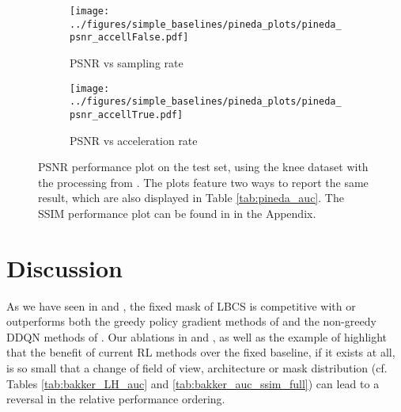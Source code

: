 \begin{figure}[!ht]
    \centering
    \begin{subfigure}[b]{0.49\textwidth}
    \centering
    \texttt{[image: ../figures/simple\_baselines/pineda\_plots/pineda\_psnr\_accellFalse.pdf]}
    \caption{PSNR vs sampling rate}
    \label{fig:psnr_vs_sampling}
    \end{subfigure}
    \hfill
    \begin{subfigure}[b]{0.49\textwidth}
    \centering
    \texttt{[image: ../figures/simple\_baselines/pineda\_plots/pineda\_psnr\_accellTrue.pdf]}
    \caption{PSNR vs acceleration rate}
    \label{fig:psnr_acceleration_rate}
    \end{subfigure}
    \caption{PSNR performance plot on the test set, using the knee dataset with the processing from \cite{pineda2020active}. The plots feature two ways to report the same result, which are also displayed in Table \ref{tab:pineda_auc}. The SSIM performance plot can be found in  in the Appendix.}
    \label{fig:pin_three}
\end{figure}

\section{Discussion}

As we have seen in  and , the fixed mask of LBCS is competitive with or outperforms both the greedy policy gradient methods of \citet{bakker2020experimental} and the non-greedy DDQN methods of \citet{pineda2020active}.
Our ablations in  and , as well as the example of  highlight that the benefit of current RL methods over the fixed baseline, if it exists at all, is so small that a change of field of view, architecture or mask distribution (cf. Tables \ref{tab:bakker_LH_auc} and \ref{tab:bakker_auc_ssim_full}) can lead to a reversal in the relative performance ordering.


